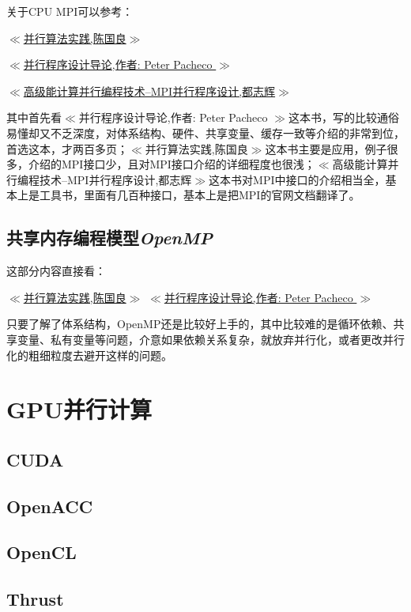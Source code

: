 \documentclass[utf8]{book}
\begin{document}
	关于CPU MPI可以参考：
	
	\href{https://book.douban.com/subject/1187182/}{$\ll$并行算法实践,陈国良$\gg$}
	
	\href{https://book.douban.com/subject/20374756/}{$\ll$并行程序设计导论,作者: Peter Pacheco $\gg$}
	
	\href{https://book.douban.com/subject/1244566/}{$\ll$高级能计算并行编程技术--MPI并行程序设计,都志辉$\gg$}
	
	其中首先看$\ll$并行程序设计导论,作者: Peter Pacheco $\gg$这本书，写的比较通俗易懂却又不乏深度，对体系结构、硬件、共享变量、缓存一致等介绍的非常到位，首选这本，才两百多页；$\ll$并行算法实践,陈国良$\gg$这本书主要是应用，例子很多，介绍的MPI接口少，且对MPI接口介绍的详细程度也很浅；$\ll$高级能计算并行编程技术--MPI并行程序设计,都志辉$\gg$这本书对MPI中接口的介绍相当全，基本上是工具书，里面有几百种接口，基本上是把MPI的官网文档翻译了。
	
	\subsection{共享内存编程模型\textit{OpenMP}}
	
	这部分内容直接看：
	
	\href{https://book.douban.com/subject/1187182/}{$\ll$并行算法实践,陈国良$\gg$}
	\href{https://book.douban.com/subject/20374756/}{$\ll$并行程序设计导论,作者: Peter Pacheco $\gg$}
	
	只要了解了体系结构，OpenMP还是比较好上手的，其中比较难的是循环依赖、共享变量、私有变量等问题，介意如果依赖关系复杂，就放弃并行化，或者更改并行化的粗细粒度去避开这样的问题。
	
	\section{GPU并行计算}
	\subsection{CUDA}
	\subsection{OpenACC}
	\subsection{OpenCL}
	\subsection{Thrust}
\end{document}
